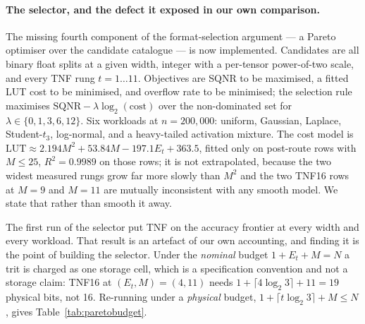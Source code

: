 \paragraph{The selector, and the defect it exposed in our own comparison.}
The missing fourth component of the format-selection argument --- a Pareto
optimiser over the candidate catalogue --- is now implemented. Candidates are all
binary float splits at a given width, integer with a per-tensor power-of-two
scale, and every TNF rung $t = 1 \ldots 11$. Objectives are SQNR to be maximised,
a fitted LUT cost to be minimised, and overflow rate to be minimised; the
selection rule maximises $\mathrm{SQNR} - \lambda\log_2(\mathrm{cost})$ over the
non-dominated set for $\lambda \in \{0,1,3,6,12\}$. Six workloads at
$n = 200{,}000$: uniform, Gaussian, Laplace, Student-$t_3$, log-normal, and a
heavy-tailed activation mixture. The cost model is
$\mathrm{LUT} \approx 2.194 M^2 + 53.84 M - 197.1 E_t + 363.5$, fitted only on
post-route rows with $M \le 25$, $R^2 = 0.9989$ on those rows; it is not
extrapolated, because the two widest measured rungs grow far more slowly than
$M^2$ and the two TNF16 rows at $M = 9$ and $M = 11$ are mutually inconsistent
with any smooth model. We state that rather than smooth it away.

The first run of the selector put TNF on the accuracy frontier at every width and
every workload. That result is an artefact of our own accounting, and finding it
is the point of building the selector. Under the \emph{nominal} budget
$1 + E_t + M = N$ a trit is charged as one storage cell, which is a specification
convention and not a storage claim: TNF16 at $(E_t,M) = (4,11)$ needs
$1 + \lceil 4\log_2 3\rceil + 11 = 19$ physical bits, not 16. Re-running under a
\emph{physical} budget, $1 + \lceil t\log_2 3\rceil + M \le N$, gives
Table~\ref{tab:paretobudget}.

